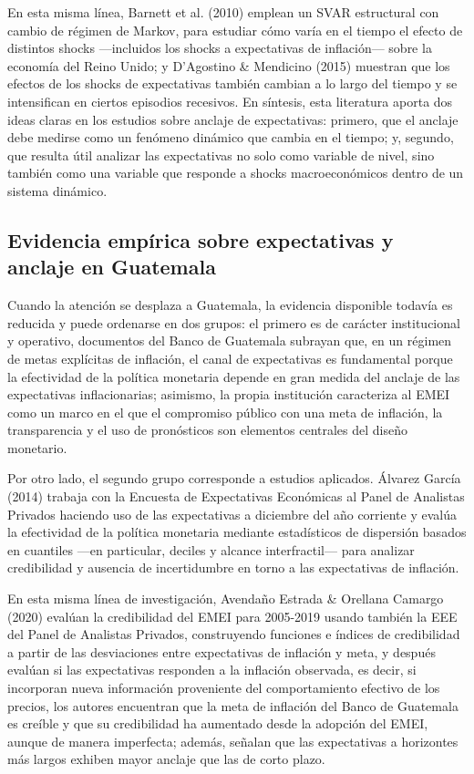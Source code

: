 \documentclass[
  10.5pt,
  letterpaper,
  twocolumn]{article}
\begin{document}
En esta misma línea, Barnett et al. (2010) emplean un SVAR estructural
con cambio de régimen de Markov, para estudiar cómo varía en el tiempo
el efecto de distintos shocks ---incluidos los shocks a expectativas de
inflación--- sobre la economía del Reino Unido; y D'Agostino \&
Mendicino (2015) muestran que los efectos de los shocks de expectativas
también cambian a lo largo del tiempo y se intensifican en ciertos
episodios recesivos. En síntesis, esta literatura aporta dos ideas
claras en los estudios sobre anclaje de expectativas: primero, que el
anclaje debe medirse como un fenómeno dinámico que cambia en el tiempo;
y, segundo, que resulta útil analizar las expectativas no solo como
variable de nivel, sino también como una variable que responde a shocks
macroeconómicos dentro de un sistema dinámico.

\subsection{Evidencia empírica sobre expectativas y anclaje en
Guatemala}\label{evidencia-empuxedrica-sobre-expectativas-y-anclaje-en-guatemala}

Cuando la atención se desplaza a Guatemala, la evidencia disponible
todavía es reducida y puede ordenarse en dos grupos: el primero es de
carácter institucional y operativo, documentos del Banco de Guatemala
subrayan que, en un régimen de metas explícitas de inflación, el canal
de expectativas es fundamental porque la efectividad de la política
monetaria depende en gran medida del anclaje de las expectativas
inflacionarias; asimismo, la propia institución caracteriza al EMEI como
un marco en el que el compromiso público con una meta de inflación, la
transparencia y el uso de pronósticos son elementos centrales del diseño
monetario.

Por otro lado, el segundo grupo corresponde a estudios aplicados.
Álvarez García (2014) trabaja con la Encuesta de Expectativas Económicas
al Panel de Analistas Privados haciendo uso de las expectativas a
diciembre del año corriente y evalúa la efectividad de la política
monetaria mediante estadísticos de dispersión basados en cuantiles ---en
particular, deciles y alcance interfractil--- para analizar credibilidad
y ausencia de incertidumbre en torno a las expectativas de inflación.

En esta misma línea de investigación, Avendaño Estrada \& Orellana
Camargo (2020) evalúan la credibilidad del EMEI para 2005-2019 usando
también la EEE del Panel de Analistas Privados, construyendo funciones e
índices de credibilidad a partir de las desviaciones entre expectativas
de inflación y meta, y después evalúan si las expectativas responden a
la inflación observada, es decir, si incorporan nueva información
proveniente del comportamiento efectivo de los precios, los autores
encuentran que la meta de inflación del Banco de Guatemala es creíble y
que su credibilidad ha aumentado desde la adopción del EMEI, aunque de
manera imperfecta; además, señalan que las expectativas a horizontes más
largos exhiben mayor anclaje que las de corto plazo.
\end{document}
